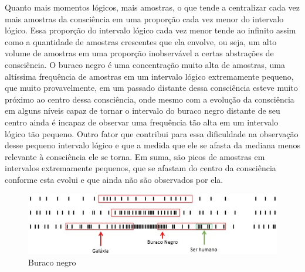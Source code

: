 Quanto mais momentos lógicos, mais amostras, o que tende a centralizar cada vez mais amostras da consciência em uma proporção cada vez menor do intervalo lógico. Essa proporção do intervalo lógico cada vez menor tende ao infinito assim como a quantidade de amostras crescentes que ela envolve, ou seja, um alto volume de amostras em uma proporção inobservável a certas abstrações de consciência. O buraco negro é uma concentração muito alta de amostras, uma altíssima frequência de amostras em um intervalo lógico extremamente pequeno, que muito provavelmente, em um passado distante dessa consciência esteve muito próximo ao centro dessa consciência, onde mesmo com a evolução da consciência em alguns níveis capaz de tornar o intervalo do buraco negro distante de seu centro ainda é incapaz de observar uma frequência tão alta em um intervalo lógico tão pequeno. Outro fator que contribui para essa dificuldade na observação desse pequeno intervalo lógico e que a medida que ele se afasta da mediana menos relevante à consciência ele se torna. Em suma, são picos de amostras em intervalos extremamente pequenos, que se afastam do centro da consciência conforme esta evolui e que ainda não são observados por ela.

\begin{figure}[H]
\caption{Buraco negro}
\label{fig:consciousness_black_hole}
\centering
\includegraphics[scale=1]{sections/images/consciousness_black_hole.jpg}
\end{figure}
